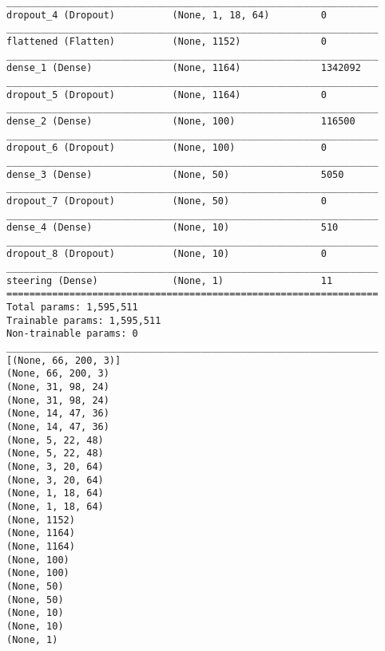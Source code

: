 \begin{verbatim}
_________________________________________________________________
dropout_4 (Dropout)          (None, 1, 18, 64)         0         
_________________________________________________________________
flattened (Flatten)          (None, 1152)              0         
_________________________________________________________________
dense_1 (Dense)              (None, 1164)              1342092   
_________________________________________________________________
dropout_5 (Dropout)          (None, 1164)              0         
_________________________________________________________________
dense_2 (Dense)              (None, 100)               116500    
_________________________________________________________________
dropout_6 (Dropout)          (None, 100)               0         
_________________________________________________________________
dense_3 (Dense)              (None, 50)                5050      
_________________________________________________________________
dropout_7 (Dropout)          (None, 50)                0         
_________________________________________________________________
dense_4 (Dense)              (None, 10)                510       
_________________________________________________________________
dropout_8 (Dropout)          (None, 10)                0         
_________________________________________________________________
steering (Dense)             (None, 1)                 11        
=================================================================
Total params: 1,595,511
Trainable params: 1,595,511
Non-trainable params: 0
_________________________________________________________________
[(None, 66, 200, 3)]
(None, 66, 200, 3)
(None, 31, 98, 24)
(None, 31, 98, 24)
(None, 14, 47, 36)
(None, 14, 47, 36)
(None, 5, 22, 48)
(None, 5, 22, 48)
(None, 3, 20, 64)
(None, 3, 20, 64)
(None, 1, 18, 64)
(None, 1, 18, 64)
(None, 1152)
(None, 1164)
(None, 1164)
(None, 100)
(None, 100)
(None, 50)
(None, 50)
(None, 10)
(None, 10)
(None, 1)
\end{verbatim}

